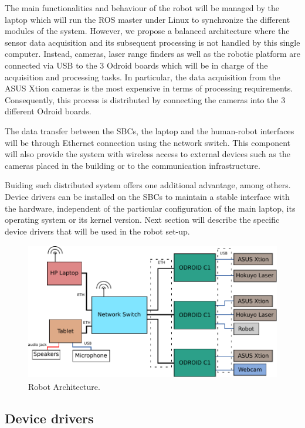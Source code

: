 The main functionalities and behaviour of the robot will be managed by
the laptop which will run the ROS master under Linux to synchronize the different
modules of the system.  However, we propose a balanced architecture
where the sensor data acquisition and its subsequent processing is not
handled by this single computer.  Instead, cameras, laser range
finders as well as the robotic platform are connected via USB to the 3
Odroid boards which will be in charge of the acquisition and
processing tasks. In particular, the data acquisition from the ASUS
Xtion cameras is the most expensive in terms of processing
requirements. Consequently, this process is distributed by connecting
the cameras into the 3 different Odroid boards.

The data transfer between the SBCs, the laptop and the human-robot
interfaces will be through Ethernet connection using the network
switch. This component will also provide the system with wireless access to external
devices such as the cameras placed in the building or to the communication infrastructure.

Buiding such distributed system offers one additional advantage, among others. 
Device drivers can be installed on the SBCs to maintain a stable interface with the hardware, 
independent of the particular configuration of the main laptop, its operating system or its kernel version.
Next section will describe the specific device drivers that will be used in the robot set-up.

\begin{figure}[h!]
\begin{center}
\includegraphics[height=6cm]{fig/robotarchitecture.pdf}
\end{center}
\caption{Robot Architecture.}
\label{fig:architecture}
\end{figure}


\subsection{Device drivers}

